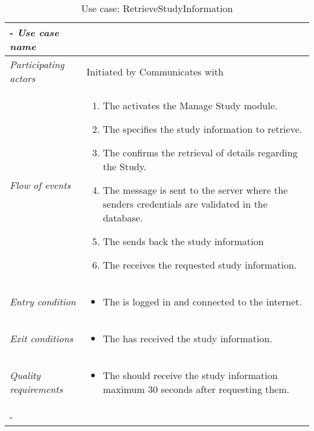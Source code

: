 
%



%
%
\begin{table}[H]
\tabulinesep=1.5mm
\begin{tabu} to 
	\tabucline[1.5pt]-
	\textit{Use case name} & \RetrieveStudyInformation \\
	\hline
	\textit{Participating actors} & Initiated by \client \newline Communicates with \serverside \\
	\hline
	\textit{Flow of events} &
	\vspace{-3mm}
	\begin{enumerate}[leftmargin=*,topsep=0pt,itemsep=-1ex]
		\item The \client activates the Manage Study module.
		\item The \client specifies the study information to retrieve.
		\item The \client confirms the retrieval of details regarding the Study. \newline
		\setlength{\itemindent}{2cm}
				\item \parbox[t]{\linewidth-\itemindent}{The message is sent to the server where the senders credentials are validated in the database.}
		\setlength{\itemindent}{2cm}
				\item \parbox[t]{\linewidth-\itemindent}{The \serverside sends back the study information}
		\item The \client receives the requested study information.
		
				
	\end{enumerate} \\
	\hline
	\textit{Entry condition} &
	\vspace{-3mm}
	\begin{itemize}[leftmargin=*,topsep=0pt,itemsep=-1ex]
		\item The \client is logged in and connected to the internet.
	\end{itemize} \\
	\hline
	\textit{Exit conditions} &
	\vspace{-3mm}
	\begin{itemize}[leftmargin=*,topsep=0pt,itemsep=-1ex]
		\item The \client has received the study information.
	\end{itemize} \\
	\hline
	\textit{Quality \newline requirements} &
	\vspace{-3mm}
	\begin{itemize}[leftmargin=*,topsep=0pt,itemsep=-1ex]
		\item The \client should receive the study information maximum 30 seconds after requesting them.
	\end{itemize} \\
	\tabucline[1.5pt]-
\end{tabu}
\caption{Use case: RetrieveStudyInformation}
\label{uc:RetrieveStudyInformation}
\end{table}
